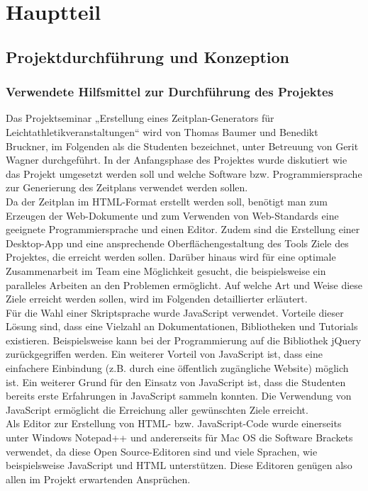 
\chapter{Hauptteil}
\label{chap:Hauptteil}

\section{Projektdurchführung und Konzeption}

\subsection{Verwendete Hilfsmittel zur Durchführung des Projektes}
Das Projektseminar „Erstellung eines Zeitplan-Generators für Leichtathletikveranstaltungen“ wird von Thomas Baumer und Benedikt Bruckner, im Folgenden als die Studenten bezeichnet, unter Betreuung von Gerit Wagner durchgeführt. In der Anfangsphase des Projektes wurde diskutiert wie das Projekt umgesetzt werden soll und welche Software bzw. Programmiersprache zur Generierung des Zeitplans verwendet werden sollen.\\
Da der Zeitplan im HTML-Format erstellt werden soll, benötigt man zum Erzeugen der Web-Dokumente und zum Verwenden von Web-Standards eine geeignete Programmiersprache und einen Editor. Zudem sind die Erstellung einer Desktop-App und eine ansprechende Oberflächengestaltung des Tools Ziele des Projektes, die erreicht werden sollen. Darüber hinaus wird für eine optimale Zusammenarbeit im Team eine Möglichkeit gesucht, die beispielsweise ein paralleles Arbeiten an den Problemen ermöglicht. Auf welche Art und Weise diese Ziele erreicht werden sollen, wird im Folgenden detaillierter erläutert.\\
Für die Wahl einer Skriptsprache wurde JavaScript verwendet. Vorteile dieser Lösung sind, dass eine Vielzahl an Dokumentationen, Bibliotheken und Tutorials existieren. Beispielsweise kann bei der Programmierung auf die Bibliothek jQuery zurückgegriffen werden. Ein weiterer Vorteil von JavaScript ist, dass eine einfachere Einbindung (z.B. durch eine öffentlich zugängliche Website) möglich ist. Ein weiterer Grund für den Einsatz von JavaScript ist, dass die Studenten bereits erste Erfahrungen in JavaScript sammeln konnten. Die Verwendung von JavaScript ermöglicht die Erreichung aller gewünschten Ziele erreicht.\\
Als Editor zur Erstellung von HTML- bzw. JavaScript-Code wurde einerseits unter Windows Notepad++ und andererseits für Mac OS die Software Brackets verwendet, da diese Open Source-Editoren sind und viele Sprachen, wie beispielsweise JavaScript und HTML unterstützen. Diese Editoren genügen also allen im Projekt erwartenden Ansprüchen.\\
